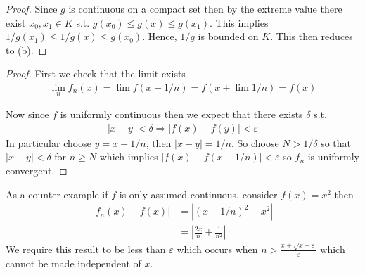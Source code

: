 \begin{proof}
    Since $g$ is continuous on a compact set then by the extreme 
    value \Thm there exist $x_0,x_1\in K$ s.t. $g(x_0) 
    \leq g(x) \leq g(x_1)$. This implies $1/g(x_1) 
    \leq 1/g(x) \leq g(x_0)$. Hence, $1/g$ is bounded on $K$. This 
    then reduces to  (b).
\end{proof}

\begin{proof}
    First we check that the limit exists 
    \begin{align*}
        \lim_n f_n(x) = \lim f(x+1/n) = f(x+\lim 1/n) = f(x)
    \end{align*}

    Now since $f$ is uniformly continuous then we expect that 
    there exists $\delta$ s.t. 
    \begin{align*}
        |x-y| < \delta \Rightarrow |f(x) - f(y)|<\varepsilon
    \end{align*}
    In particular choose $y=x+1/n$, then $|x-y|=1/n$. So choose 
    $N>1/\delta$ so that $|x-y|<\delta$ for $n\geq N$ which 
    implies $|f(x)-f(x+1/n)|<\varepsilon$ so $f_n$ is uniformly
    convergent. 
\end{proof}

As a counter example if $f$ is only assumed continuous, 
consider $f(x)=x^2$ then 
\begin{align*}
    |f_n(x) - f(x)| &= |(x+1/n)^2 - x^2| \\
    &= |\frac{2x}{n}+\frac{1}{n^2}|
\end{align*}
We require this result to be less than $\varepsilon$ which 
occurs when $n>\frac{x+\sqrt{x+\varepsilon}}{\varepsilon}$
which cannot be made independent of $x$.

